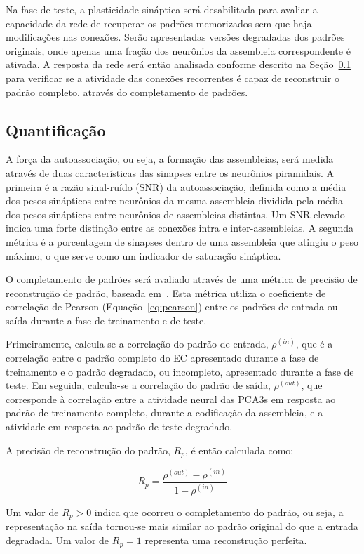 Na fase de teste, a plasticidade sináptica será desabilitada para avaliar a capacidade da rede de recuperar os padrões memorizados
sem que haja modificações nas conexões. Serão apresentadas versões degradadas dos padrões originais, onde apenas uma fração dos
neurônios da assembleia correspondente é ativada. A resposta da rede será então analisada conforme descrito na
Seção~\ref{sec:quantificacao} para verificar se a atividade das conexões recorrentes é capaz de reconstruir o padrão completo,
através do completamento de padrões.

\subsection{Quantificação}\label{sec:quantificacao}

A força da autoassociação, ou seja, a formação das assembleias, será medida através de duas características das sinapses entre os
neurônios piramidais. A primeira é a razão sinal-ruído (SNR) da autoassociação, definida como a média dos pesos sinápticos entre
neurônios da mesma assembleia dividida pela média dos pesos sinápticos entre neurônios de assembleias distintas. Um SNR elevado
indica uma forte distinção entre as conexões intra e inter-assembleias. A segunda métrica é a porcentagem de sinapses dentro de
uma assembleia que atingiu o peso máximo, o que serve como um indicador de saturação sináptica.

O completamento de padrões será avaliado através de uma métrica de precisão de reconstrução de padrão, baseada
em~\cite{kopsickFormation2024}. Esta métrica utiliza o coeficiente de correlação de Pearson (Equação~\ref{eq:pearson}) entre os
padrões de entrada ou saída durante a fase de treinamento e de teste. 

Primeiramente, calcula-se a correlação do padrão de entrada, $\rho^{(in)}$, que é a correlação entre o padrão completo do EC
apresentado durante a fase de treinamento e o padrão degradado, ou incompleto, apresentado durante a fase de teste. Em seguida,
calcula-se a correlação do padrão de saída, $\rho^{(out)}$, que corresponde à correlação entre a atividade neural das PCA3s em
resposta ao padrão de treinamento completo, durante a codificação da assembleia, e a atividade em resposta ao padrão de teste
degradado.

A precisão de reconstrução do padrão, $R_p$, é então calculada como:

\begin{equation}
    \label{eq:rp}
    R_p = \frac{\rho^{(out)} - \rho^{(in)}}{1 - \rho^{(in)}}
\end{equation}

Um valor de $R_p > 0$ indica que ocorreu o completamento do padrão, ou seja, a representação na saída tornou-se mais similar ao
padrão original do que a entrada degradada. Um valor de $R_p = 1$ representa uma reconstrução perfeita.
